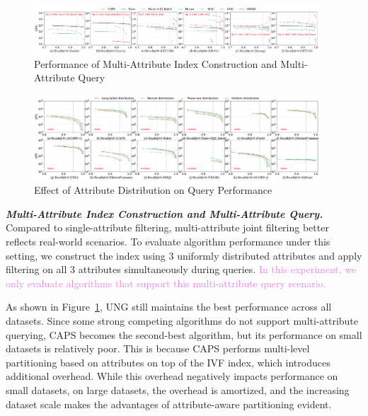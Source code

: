 \documentclass[sigconf, nonacm]{acmart}
\begin{document}
{\begin{figure}
		\includegraphics[width=0.95\textwidth]{figures/exp/exp_4_1_MultiLabel_1thread.pdf}
		\caption{Performance of Multi-Attribute Index Construction and Multi-Attribute Query}
		\label{fig:exp_4_1_MultiLabel_1thread}
	\end{figure}
	
	
	\begin{figure}
	\centering

	\includegraphics[width=0.95\textwidth]{figures/exp/exp_3_1.pdf}
	\caption{
		Effect of Attribute Distribution on Query Performance}
		
	\label{fig:exp_3_1}

	\end{figure}
	
	
	
	
	
	\textit{\textbf{Multi-Attribute Index Construction and Multi-Attribute Query.}}  
	Compared to single-attribute filtering, multi-attribute joint filtering better reflects real-world scenarios. To evaluate algorithm performance under this setting, we construct the index using 3 uniformly distributed attributes and apply filtering on all 3 attributes simultaneously during queries. \textcolor{violet}{In this experiment, we only evaluate algorithms that support this multi-attribute query scenario.}
	
	As shown in Figure~\ref{fig:exp_4_1_MultiLabel_1thread}, UNG still maintains the best performance across all datasets. Since some strong competing algorithms do not support multi-attribute querying, CAPS becomes the second-best algorithm, but its performance on small datasets is relatively poor. This is because CAPS performs multi-level partitioning based on attributes on top of the IVF index, which introduces additional overhead. While this overhead negatively impacts performance on small datasets, on large datasets, the overhead is amortized, and the increasing dataset scale makes the advantages of attribute-aware partitioning evident.
	
}
\end{document}
